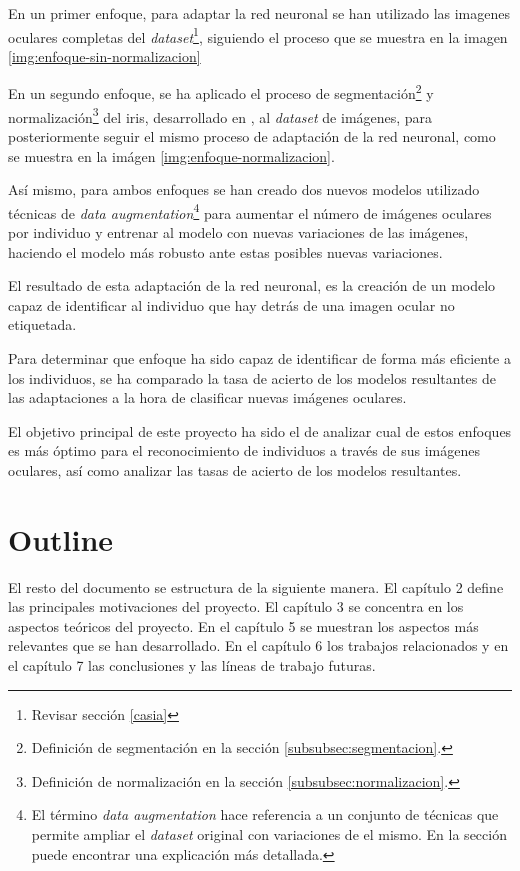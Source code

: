 En un primer enfoque, para adaptar la red neuronal se han utilizado las imagenes oculares completas del \textit{dataset}\footnote{Revisar sección \ref{casia}}, siguiendo el proceso que se muestra en la imagen \ref{img:enfoque-sin-normalizacion}



En un segundo enfoque, se ha aplicado el proceso de segmentación\footnote{Definición de segmentación en la sección \ref{subsubsec:segmentacion}.} y normalización\footnote{Definición de normalización en la sección \ref{subsubsec:normalizacion}.} del iris, desarrollado en \cite{tfg_iris_2020}, al \textit{dataset} de imágenes, para posteriormente seguir el mismo proceso de adaptación de la red neuronal, como se muestra en la imágen \ref{img:enfoque-normalizacion}.



Así mismo, para ambos enfoques se han creado dos nuevos modelos utilizado técnicas de \textit{data augmentation}\footnote{El término \textit{data augmentation} hace referencia a un conjunto de técnicas que permite ampliar el \textit{dataset} original con variaciones de el mismo. En la sección  puede encontrar una explicación más detallada.} para aumentar el número de imágenes oculares por individuo y entrenar al modelo con nuevas variaciones de las imágenes, haciendo el modelo más robusto ante estas posibles nuevas variaciones.

El resultado de esta adaptación de la red neuronal, es la creación de un modelo capaz de identificar al individuo que hay detrás de una imagen ocular no etiquetada. 

Para determinar que enfoque ha sido capaz de identificar de forma más eficiente a los individuos, se ha comparado la tasa de acierto de los modelos resultantes de las adaptaciones a la hora de clasificar nuevas imágenes oculares. 

El objetivo principal de este proyecto ha sido el de analizar cual de estos enfoques es más óptimo para el reconocimiento de individuos a través de sus imágenes oculares, así como analizar las tasas de acierto de los modelos resultantes.

\section{Outline}

El resto del documento se estructura de la siguiente manera. El capítulo 2  define las principales motivaciones del proyecto. El capítulo 3  se concentra en los aspectos teóricos del proyecto. En el capítulo 5  se muestran los aspectos
más relevantes que se han desarrollado. En el capítulo 6  los trabajos relacionados y en el capítulo 7  las conclusiones y las líneas de trabajo futuras.
